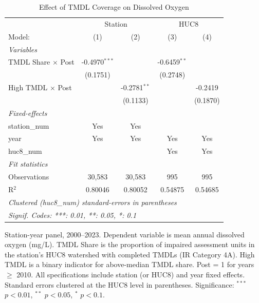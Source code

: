 
\begin{table}[htbp]
   \caption{\label{tab:main} Effect of TMDL Coverage on Dissolved Oxygen}
   \centering
   \begin{tabular}{lcccc}
      \tabularnewline \midrule \midrule
       & \multicolumn{2}{c}{Station} & \multicolumn{2}{c}{HUC8} \\ 
      Model:                    & (1)             & (2)            & (3)            & (4)\\  
      \midrule
      \emph{Variables}\\
      TMDL Share $\times$ Post  & -0.4970$^{***}$ &                & -0.6459$^{**}$ &   \\   
                                & (0.1751)        &                & (0.2748)       &   \\   
      High TMDL $\times$ Post   &                 & -0.2781$^{**}$ &                & -0.2419\\   
                                &                 & (0.1133)       &                & (0.1870)\\   
      \midrule
      \emph{Fixed-effects}\\
      station\_num              & Yes             & Yes            &                & \\  
      year                      & Yes             & Yes            & Yes            & Yes\\  
      huc8\_num                 &                 &                & Yes            & Yes\\  
      \midrule
      \emph{Fit statistics}\\
      Observations              & 30,583          & 30,583         & 995            & 995\\  
      R$^2$                     & 0.80046         & 0.80052        & 0.54875        & 0.54685\\  
      \midrule \midrule
      \multicolumn{5}{l}{\emph{Clustered (huc8\_num) standard-errors in parentheses}}\\
      \multicolumn{5}{l}{\emph{Signif. Codes: ***: 0.01, **: 0.05, *: 0.1}}\\
   \end{tabular}
   
   \par \raggedright 
   Station-year panel, 2000--2023. Dependent variable is mean annual dissolved oxygen (mg/L). TMDL Share is the proportion of impaired assessment units in the station's HUC8 watershed with completed TMDLs (IR Category 4A). High TMDL is a binary indicator for above-median TMDL share. Post = 1 for years $\geq$ 2010. All specifications include station (or HUC8) and year fixed effects. Standard errors clustered at the HUC8 level in parentheses. Significance: $^{***}$ $p<0.01$, $^{**}$ $p<0.05$, $^{*}$ $p<0.1$.
\end{table}


